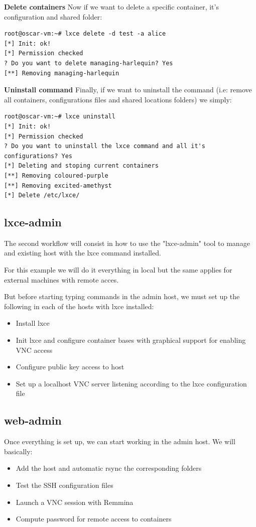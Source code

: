\textbf{Delete containers}
Now if we want to delete a specific container, it's configuration and shared folder:

\begin{verbatim}
root@oscar-vm:~# lxce delete -d test -a alice
[*] Init: ok!
[*] Permission checked
? Do you want to delete managing-harlequin? Yes
[**] Removing managing-harlequin
\end{verbatim}

\textbf{Uninstall command}
Finally, if we want to uninstall the command (i.e: remove all containers, configurations files and shared locations folders) we simply:
\begin{verbatim}
root@oscar-vm:~# lxce uninstall
[*] Init: ok!
[*] Permission checked
? Do you want to uninstall the lxce command and all it's configurations? Yes
[*] Deleting and stoping current containers
[**] Removing coloured-purple
[**] Removing excited-amethyst
[*] Delete /etc/lxce/
\end{verbatim}

\subsection{lxce-admin}
The second workflow will consist in how to use the "lxce-admin" tool to manage and existing host with the lxce command installed.

For this example we will do it everything in local but the same applies for external machines with remote acces.

But before starting typing commands in the admin host, we must set up the following in each of the hosts with lxce installed:
\begin{itemize}
	\item{Install lxce}
	\item{Init lxce and configure container bases with graphical support for enabling VNC access}
	\item{Configure public key access to host}
	\item{Set up a localhost VNC server listening according to the lxce configuration file}
\end{itemize}
\subsection{web-admin}

Once everything is set up, we can start working in the admin host. We will basically:
\begin{itemize}
	\item{Add the host and automatic rsync the corresponding folders}
	\item{Test the SSH configuration files}
	\item{Launch a VNC session with Remmina}
	\item{Compute password for remote access to containers}
\end{itemize}

